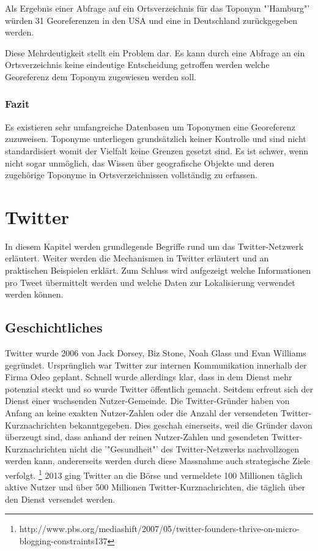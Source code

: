			Als Ergebnis einer Abfrage auf ein Ortsverzeichnis für das Toponym "'Hamburg"' würden 31 Georeferenzen in den USA und eine in Deutschland zurückgegeben werden. 

			Diese Mehrdeutigkeit stellt ein Problem dar.
			Es kann durch eine Abfrage an ein Ortsverzeichnis keine eindeutige Entscheidung getroffen werden welche Georeferenz dem Toponym zugewiesen werden soll. 

		\subsubsection{Fazit}

			Es existieren sehr umfangreiche Datenbasen um Toponymen eine Georeferenz zuzuweisen. 
			Toponyme unterliegen grundsätzlich keiner Kontrolle und sind nicht standardisiert womit der Vielfalt keine Grenzen gesetzt sind.
			Es ist schwer, wenn nicht sogar unmöglich, das Wissen über geografische Objekte und deren zugehörige Toponyme in Ortsverzeichnissen vollständig zu erfassen.

	\section{Twitter} 
	
		In diesem Kapitel werden grundlegende Begriffe rund um das Twitter-Netzwerk erläutert. 
		Weiter werden die Mechanismen in Twitter erläutert und an praktischen Beispielen erklärt. 
		Zum Schluss wird aufgezeigt welche Informationen pro Tweet übermittelt werden und welche Daten zur Lokalisierung verwendet werden können.

			\subsection{Geschichtliches}
			Twitter wurde 2006 von Jack Dorsey, Biz Stone, Noah Glass und Evan Williams gegründet.
			Ursprünglich war Twitter zur internen Kommunikation innerhalb der Firma Odeo geplant.
			Schnell wurde allerdings klar, dass in dem Dienst mehr potenzial steckt und so wurde Twitter öffentlich gemacht.
			Seitdem erfreut sich der Dienst einer wachsenden Nutzer-Gemeinde.
			Die Twitter-Gründer haben von Anfang an keine exakten Nutzer-Zahlen oder die Anzahl der versendeten Twitter-Kurznachrichten bekanntgegeben.
			Dies geschah einerseits, weil die Gründer davon überzeugt sind, dass anhand der reinen Nutzer-Zahlen und gesendeten Twitter-Kurznachrichten nicht die '"Gesundheit"' des Twitter-Netzwerks nachvollzogen werden kann, andererseits werden durch diese Massnahme auch strategische Ziele verfolgt.  \footnote{http://www.pbs.org/mediashift/2007/05/twitter-founders-thrive-on-micro-blogging-constraints137}
			2013 ging Twitter an die Börse und vermeldete 100 Millionen täglich aktive Nutzer und über 500 Millionen Twitter-Kurznachrichten, die täglich über den Dienst versendet werden. 

